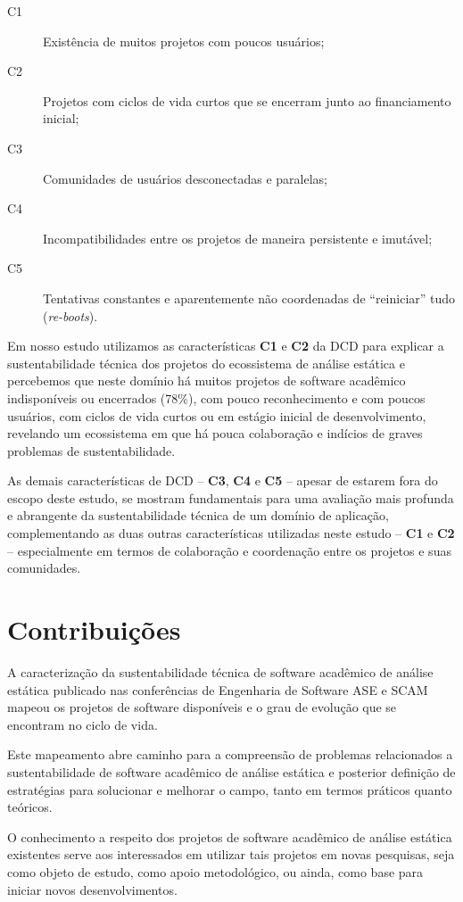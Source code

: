 \begin{description}
  \item [C1] Existência de muitos projetos com poucos usuários;
  \item [C2] Projetos com ciclos de vida curtos que se encerram junto ao financiamento inicial;
  \item [C3] Comunidades de usuários desconectadas e paralelas;
  \item [C4] Incompatibilidades entre os projetos de maneira persistente e imutável;
  \item [C5] Tentativas constantes e aparentemente não coordenadas de ``reiniciar'' tudo ({\it re-boots}).
\end{description}

Em nosso estudo utilizamos as características {\bf C1} e {\bf C2} da DCD para
explicar a sustentabilidade técnica dos projetos do ecossistema de análise
estática e percebemos que neste domínio há muitos projetos de software
acadêmico indisponíveis ou encerrados (78\%), com pouco reconhecimento e com
poucos usuários, com ciclos de vida curtos ou em estágio inicial de
desenvolvimento, revelando um ecossistema em que há pouca colaboração e
indícios de graves problemas de sustentabilidade.

As demais características de DCD -- {\bf C3}, {\bf C4} e {\bf C5} -- apesar de
estarem fora do escopo deste estudo, se mostram fundamentais para uma avaliação
mais profunda e abrangente da sustentabilidade técnica de um domínio de
aplicação, complementando as duas outras características utilizadas neste
estudo -- {\bf C1} e {\bf C2} -- especialmente em termos de colaboração e
coordenação entre os projetos e suas comunidades.

\section{Contribuições}

A caracterização da sustentabilidade técnica de software acadêmico de análise estática
publicado nas conferências de Engenharia de Software ASE e SCAM 
mapeou os projetos de software disponíveis e o grau de evolução que
se encontram no ciclo de vida.

Este mapeamento abre caminho para a compreensão de problemas relacionados a 
sustentabilidade de software acadêmico de análise estática 
e posterior definição de estratégias para
solucionar e melhorar o campo, tanto em termos práticos quanto teóricos.

O conhecimento a respeito dos projetos de software acadêmico de análise estática
existentes serve aos interessados em utilizar tais projetos em novas pesquisas,
seja como objeto de estudo, como apoio metodológico, ou ainda, como base para
iniciar novos desenvolvimentos.

